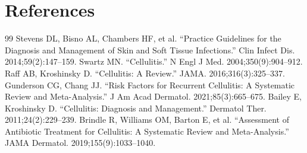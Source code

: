 \section*{References}
\begin{thebibliography}{99}
 Stevens DL, Bisno AL, Chambers HF, et al. ``Practice Guidelines for the Diagnosis and Management of Skin and Soft Tissue Infections.'' Clin Infect Dis. 2014;59(2):147--159.
 Swartz MN. ``Cellulitis.'' N Engl J Med. 2004;350(9):904--912.
 Raff AB, Kroshinsky D. ``Cellulitis: A Review.'' JAMA. 2016;316(3):325--337.
 Gunderson CG, Chang JJ. ``Risk Factors for Recurrent Cellulitis: A Systematic Review and Meta-Analysis.'' J Am Acad Dermatol. 2021;85(3):665--675.
 Bailey E, Kroshinsky D. ``Cellulitis: Diagnosis and Management.'' Dermatol Ther. 2011;24(2):229--239.
 Brindle R, Williams OM, Barton E, et al. ``Assessment of Antibiotic Treatment for Cellulitis: A Systematic Review and Meta-Analysis.'' JAMA Dermatol. 2019;155(9):1033--1040.
\end{thebibliography}
